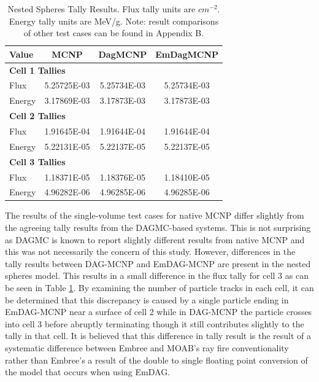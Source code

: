 \documentclass[12pt, a4paper]{article}
\begin{document}
\begin{table}[H]
  \small
  \begin{center}
    \begin{tabular}{lccc}
      \toprule
      Value & MCNP & DagMCNP & EmDagMCNP \\
      \toprule
      \multicolumn{4}{l}{\textbf{Cell 1 Tallies}} \\
      \hline
      Flux  & 5.25725E-03 & 5.25734E-03 & 5.25734E-03 \\
      Energy  & 3.17869E-03 &  3.17873E-03 &  3.17873E-03 \\
      \hline
      \multicolumn{4}{l}{\textbf{Cell 2 Tallies}} \\
      \hline
      Flux  & 1.91645E-04 & 1.91644E-04 & 1.91644E-04 \\
      Energy  & 5.22131E-05 & 5.22137E-05 & 5.22137E-05 \\
      \hline
      \multicolumn{4}{l}{\textbf{Cell 3 Tallies}} \\
      \hline
      Flux  & 1.18371E-05 & 1.18376E-05 & 1.18410E-05 \\
      Energy  & 4.96282E-06 & 4.96285E-06 & 4.96285E-06 \\
      \bottomrule
                        
    \end{tabular}
    \caption{Nested Spheres Tally Results. Flux tally units are $cm^{-2}$. Energy tally units are MeV/g. Note: result comparisons of other test cases can be found in Appendix B.}
    \label{nestedspheres}
  \end{center}
\end{table}


The results of the single-volume test cases for native MCNP differ slightly from the agreeing tally results from the DAGMC-based systems. This is not surprising as DAGMC is known to report slightly different results from native MCNP and this was not necessarily the concern of this study. However, differences in the tally results between DAG-MCNP and EmDAG-MCNP are present in the nested spheres model. This results in a small difference in the flux tally for cell 3 as can be seen in Table \ref{nestedspheres}. By examining the number of particle tracks in each cell, it can be determined that this discrepancy is caused by a single particle ending in EmDAG-MCNP near a surface of cell 2 while in DAG-MCNP the particle crosses into cell 3 before abruptly terminating though it still contributes slightly to the tally in that cell. It is believed that this difference in tally result is the result of a systematic difference between Embree and MOAB's ray fire conventionality rather than Embree's a result of the double to single floating point conversion of the model that occurs when using EmDAG.
\end{document}
